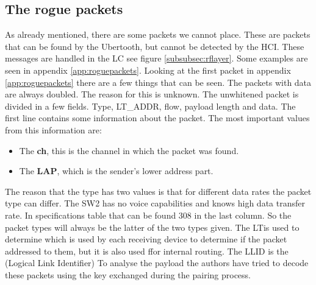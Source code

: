 \subsection{The rogue packets}
As already mentioned, there are some packets we cannot place. These are packets that can be found by the Ubertooth, but cannot be detected by the HCI. These messages are handled in the LC see figure \ref{subsubsec:rflayer}.
Some examples are seen in appendix \ref{app:roguepackets}.
Looking at the first packet in appendix \ref{app:roguepackets} there are a few things that can be seen. The packets with data are always doubled. The reason for this is unknown. The unwhitened packet is divided in a few fields. Type, LT\_ADDR, flow, payload length and data. The first line contains some information about the packet. The most important values from this information are:
\begin{itemize} 
\item The \textbf{ch}, this is the channel in which the packet was found.
\item The \textbf{LAP}, which is the sender's lower address part.
\end{itemize}
The reason that the type has two values is that for different data rates the packet type can differ. The SW2 has no voice capabilities and knows high data transfer rate. In specifications table that can be found 308 in the last column. So the packet types will always be the latter of the two types given.
The LT\ADDR is used to determine which is used by each receiving device to determine if the packet addressed to them, but it is also used ffor internal routing.
The LLID is the (Logical Link Identifier)
To analyse the payload the authors have tried to decode these packets using the key exchanged during the pairing process.
